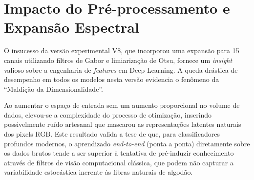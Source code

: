 \section{Impacto do Pré-processamento e Expansão Espectral}

O insucesso da versão experimental V8, que incorporou uma expansão para 15 canais utilizando filtros de Gabor e limiarização de Otsu, fornece um \textit{insight} valioso sobre a engenharia de \textit{features} em Deep Learning. A queda drástica de desempenho em todos os modelos nesta versão evidencia o fenômeno da ``Maldição da Dimensionalidade''.

Ao aumentar o espaço de entrada sem um aumento proporcional no volume de dados, elevou-se a complexidade do processo de otimização, inserindo possivelmente ruído artesanal que mascarou as representações latentes naturais dos pixels RGB. Este resultado valida a tese de que, para classificadores profundos modernos, o aprendizado \textit{end-to-end} (ponta a ponta) diretamente sobre os dados brutos tende a ser superior à tentativa de pré-induzir conhecimento através de filtros de visão computacional clássica, que podem não capturar a variabilidade estocástica inerente às fibras naturais de algodão.
